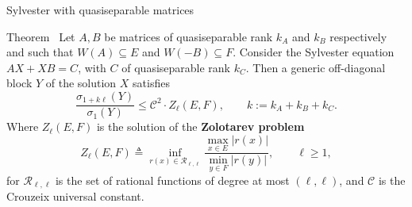 \documentclass[aspectratio=169,xcolor=dvipsnames]{beamer}
\begin{document}
	\begin{frame}{Sylvester with quasiseparable matrices}
		
	\begin{alertblock}{Theorem~\parencite[Theorem~2.12]{MR3867617}}
		Let $A, B$ be matrices of quasiseparable
		rank $k_A$ and $k_B$ respectively and such that $W(A) \subseteq E$ and 
		$W(-B) \subseteq F$. Consider 
		the Sylvester equation $AX + XB = C$, with $C$ of
		quasiseparable rank $k_C$. Then a generic off-diagonal block $Y$ of
		the solution $X$ satisfies
		\[
		\frac{\sigma_{1 + k\ell}(Y)}{\sigma_1(Y)} \leq \mathcal C^2\cdot Z_{\ell}(E, F), \qquad k:=k_A+k_B+k_C. 
		\]
		Where $Z_{\ell}(E, F)$ is the solution of the \textbf{Zolotarev problem} 
		\[Z_\ell(E, F) \triangleq \inf_{r(x) \in \mathcal R_{\ell,\ell}}
		\frac{\max_{x \in E} |r(x)|}{\min_{y \in F} |r(y)|}, \qquad
		\ell \geq 1, 
		\]
		for $\mathcal R_{\ell,\ell}$ is the set of rational functions of degree
		at most $(\ell,\ell)$, and $\mathcal{C}$ is the Crouzeix universal constant.
	\end{alertblock}
		
	\end{frame}
\end{document}
